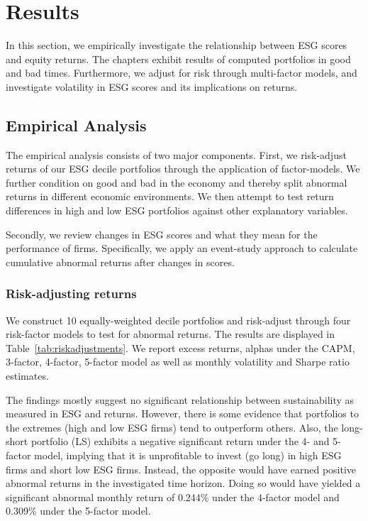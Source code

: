 \documentclass[11pt]{article}
\begin{document}



\section{Results}


In this section, we empirically investigate the relationship between ESG scores and equity returns. The chapters exhibit results of computed portfolios in good and bad times. Furthermore, we adjust for risk through multi-factor models, and investigate volatility in ESG scores and its implications on returns.

\subsection{Empirical Analysis}

The empirical analysis consists of two major components. First, we risk-adjust returns of our ESG decile portfolios through the application of factor-models. We further condition on good and bad in the economy and thereby split abnormal returns in different economic environments. We then attempt to test return differences in high and low ESG portfolios against other explanatory variables. 

Secondly, we review changes in ESG scores and what they mean for the performance of firms. Specifically, we apply an event-study approach to calculate cumulative abnormal returns after changes in scores.


\subsubsection{Risk-adjusting returns}

We construct 10 equally-weighted decile portfolios and risk-adjust through four risk-factor models to test for abnormal returns. The results are displayed in Table~\ref{tab:riskadjustments}. We report excess returns, alphas under the CAPM, 3-factor, 4-factor, 5-factor model as well as monthly volatility and Sharpe ratio estimates.

The findings mostly suggest no significant relationship between sustainability as measured in ESG and returns. However, there is some evidence that portfolios to the extremes (high and low ESG firms) tend to outperform others. Also, the long-short portfolio (LS) exhibits a negative significant return under the 4- and 5-factor model, implying that it is unprofitable to invest (go long) in high ESG firms and short low ESG firms. Instead, the opposite would have earned positive abnormal returns in the investigated time horizon. Doing so would have yielded a significant abnormal monthly return of 0.244\% under the 4-factor model and 0.309\% under the 5-factor model. 
\end{document}
